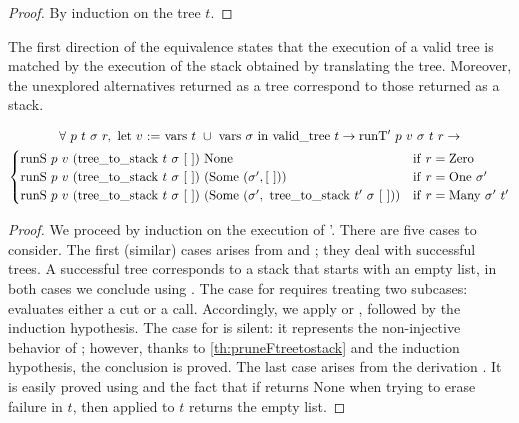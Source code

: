 
\begin{proof}By induction on the tree $t$.
\end{proof}

The first direction of the equivalence states that the execution of a
valid tree is matched by the execution of the stack obtained by
translating the tree. Moreover, the unexplored alternatives returned as
a tree correspond to those returned as a stack.

% 
\begin{theorem}\label{th:runTtorunS}%
\begin{multline*}
	\forall\ p\ t\ \sigma\ r ,\ \mathrm{let}\ v\ \mathrm{:=}\ \mathrm{vars}\ t\ \cup\ \mathrm{vars}\ \sigma\ \mathrm{in}\ 
	\mathrm{valid\_tree}\ t \to \mathrm{runT'}\ p\ v\ \sigma\ t\ r \to \\
	\begin{cases}
	\mathrm{runS}\ p\ v\ ( \mathrm{tree\_to\_stack}\ t\ \sigma\ \mnil )\ \mathrm{None} & \mathrm{if}\ r = \mathrm{Zero}\\
	\mathrm{runS}\ p\ v\ ( \mathrm{tree\_to\_stack}\ t\ \sigma\ \mnil )\ (\mathrm{Some}\ (\sigma', \mnil)) & \mathrm{if}\ r = \mathrm{One}\ \sigma'\\
	\mathrm{runS}\ p\ v\ ( \mathrm{tree\_to\_stack}\ t\ \sigma\ \mnil )\ (\mathrm{Some}\ ( \sigma' ,\ \mathrm{tree\_to\_stack}\ t'\ \sigma\ \mnil)) & \mathrm{if}\ r = \mathrm{Many}\ \sigma'\ t'\\
	\end{cases}
\end{multline*}
\end{theorem}

\begin{proof}
We proceed by induction on the execution of \runT'. There are five cases
to consider. The first (similar) cases arises from \stopot and \stopt; they deal with
successful trees. A successful tree corresponds to a stack that
starts with an empty list, in both cases
we conclude using \stops. The case for \stept
requires treating two subcases: \step evaluates either a cut or a call.
Accordingly, we apply \cuts or \calls, followed by the
induction hypothesis. The case for \backt is silent: it represents
the non-injective behavior of \ttl; however, thanks to
\cref{th:pruneFtreetostack} and the induction hypothesis, the conclusion is
proved. The last case arises from the derivation \failt. It is
easily proved using \fails and the fact that if \na returns
None when trying to erase failure in $t$, then \ttl applied to $t$
returns the empty list.
\end{proof}

